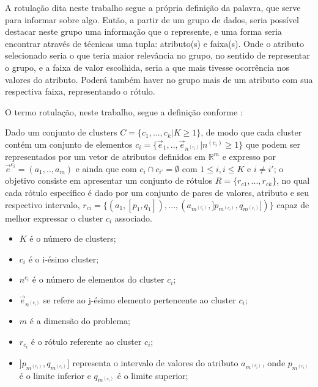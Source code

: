 A rotulação dita neste trabalho segue a própria definição da palavra, que serve para informar sobre algo. Então, a partir de um grupo de dados, seria possível destacar neste grupo uma informação que o represente, e uma forma seria encontrar através de técnicas uma tupla: atributo(s) e faixa(s). Onde o atributo selecionado seria o que teria maior relevância no grupo, no sentido de representar o grupo, e a faixa de valor escolhida, seria a que mais tivesse ocorrência nos valores do atributo. Poderá também haver no grupo mais de um atributo com sua respectiva faixa, representando o rótulo.


O termo rotulação, neste trabalho, segue a definição conforme : 

    \begin{teorema}
Dado um conjunto de clusters ${C=\{c_1,...,c_k | K \geqslant 1\} }$, de modo que cada cluster contém um conjunto de elementos ${c_i=\{\vec{e}_1,..,\vec{e}_{n^{(c_i)}}|n^{(c_i)} \geqslant 1 \}}$ que podem ser representados por um vetor de atributos definidos em ${\mathbb{R}^m }$ e expresso por ${ \vec{e}^{c_i}=(a_1,..,a_m)  }$ e ainda que  com ${ c_i \cap c_{i'}=\emptyset }$ com ${ 1 \leqslant i, i \leqslant K  }$ e ${ i \neq i' }$; o objetivo consiste em apresentar um conjunto de rótulos ${ R=\{ r_{c1},...,r_{ck} \} }$, no qual cada rótulo específico é dado por um conjunto de pares de valores, atributo e seu respectivo intervalo, ${ r_{ci}=\{ (a_1,[p_1,q_1]),...,(a_{m^{(c_i)}}, ]p_{m^{(c_i)}},q_{m^{(c_i)}}]) \} }$ capaz de melhor expressar o cluster ${c_i}$ associado.
        \begin{itemize}[noitemsep]
            \item ${K}$ é o número de clusters;
            \item ${c_i}$ é o i-ésimo cluster;
            \item ${n^{c_i}}$ é o número de elementos do cluster ${c_i}$;
            \item ${\vec{e}_{n^{(c_i)}}}$ se refere ao j-ésimo elemento pertencente ao cluster ${c_i}$;
            \item ${m}$ é a dimensão do problema;
            \item ${r_{c_i}}$ é o rótulo referente ao cluster ${c_i}$;
            \item ${]p_{m^{(c_i)}},q_{m^{(c_i)}}]}$ representa o intervalo de valores do atributo ${a_{m^{(c_i)}} }$, onde ${ p_{m^{(c_i)}} }$  é o limite inferior e ${ q_{m^{(c_i)}} }$ é o limite superior;
        \end{itemize}
    \label{teo:lopes:problema}
    \end{teorema}


